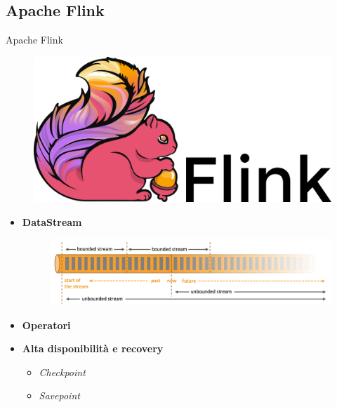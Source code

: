 \documentclass{beamer}
\begin{document}
	\subsection{Apache Flink}
	\begin{frame}{Apache Flink}
		\begin{figure}[!h] 
    		\centering 
    		\includegraphics[width=0.27\columnwidth]{../immagini/slide/Apache_Flink_logo.png}
		\end{figure}
		
		\begin{itemize}
			\item \textbf{DataStream}
				\begin{figure}[!h] 
    		\centering 
    		\includegraphics[width=0.8\columnwidth]{../immagini/slide/bounded-unbounded.png} 
		\end{figure}  \vspace{.5em}
			
			\item \textbf{Operatori}  \vspace{.5em}
			\item \textbf{Alta disponibilità e recovery} \vspace{.2em}
			\begin{itemize}
				\item \textit{Checkpoint} \vspace{.5em}
				\item \textit{Savepoint} \vspace{.5em}
				\end{itemize} \vspace{.5em}
		\end{itemize}
	\end{frame}
	
\end{document}
